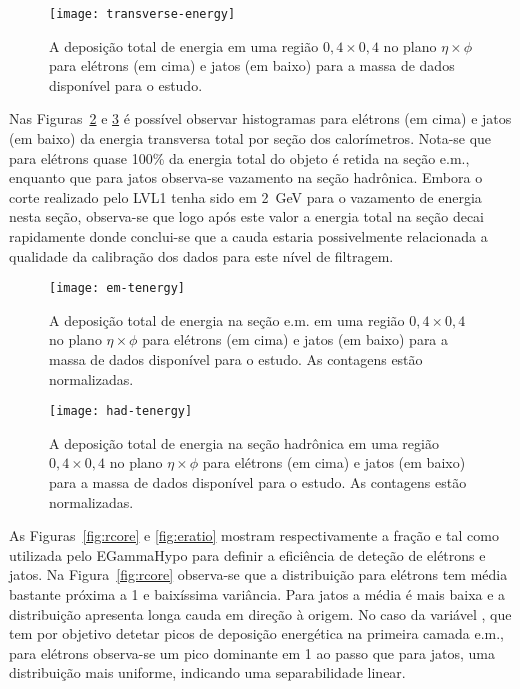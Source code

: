 
\begin{figure}
\begin{center}
\texttt{[image: transverse-energy]}
\end{center}
\caption{A deposição total de energia em uma região $0,4 \times 0,4$ no plano
$\eta\times\phi$ para elétrons (em cima) e jatos (em baixo) para a massa de
dados disponível para o estudo.}
\label{fig:transverse-energy}
\end{figure}

Nas Figuras~\ref{fig:em-tenergy} e \ref{fig:had-tenergy} é pos\-sí\-vel
observar histogramas para e\-lé\-trons (em cima) e jatos (em baixo) da energia
transversa total por seção dos calorímetros. Nota-se que para elétrons quase
100\% da energia total do objeto é retida na seção e.m., enquanto que para
jatos observa-se vazamento na seção hadrônica. Embora o corte realizado pelo
LVL1 tenha sido em 2~GeV para o vazamento de energia nesta seção, observa-se
que logo após este valor a energia total na seção decai rapidamente donde
conclui-se que a cauda estaria possivelmente relacionada a qualidade da
calibração dos dados para este nível de filtragem.

\begin{figure}
\begin{center}
\texttt{[image: em-tenergy]}
\end{center}
\caption{A deposição total de energia na seção e.m. em uma região $0,4 \times
0,4$ no plano $\eta\times\phi$ para elétrons (em cima) e jatos (em baixo) para
a massa de dados disponível para o estudo. As contagens estão normalizadas.}
\label{fig:em-tenergy}
\end{figure}

\begin{figure}
\begin{center}
\texttt{[image: had-tenergy]}
\end{center}
\caption{A deposição total de energia na seção hadrônica em uma região $0,4 \times
0,4$ no plano $\eta\times\phi$ para elétrons (em cima) e jatos (em baixo) para
a massa de dados disponível para o estudo. As contagens estão normalizadas.}
\label{fig:had-tenergy}
\end{figure}

As Figuras~\ref{fig:rcore} e \ref{fig:eratio} mostram respectivamente a fração
\rcore e \eratio tal como utilizada pelo EGammaHypo para definir a eficiência
de deteção de elétrons e jatos. Na Figura~\ref{fig:rcore} observa-se que a
distribuição para elétrons tem média bastante próxima a 1 e baixíssima
variância. Para jatos a média é mais baixa e a distribuição apresenta longa
cauda em direção à origem. No caso da variável \eratio, que tem por objetivo
detetar picos de deposição energética na primeira camada e.m., para elétrons
observa-se um pico dominante em 1 ao passo que para jatos, uma distribuição
mais uniforme, indicando uma separabilidade linear.

